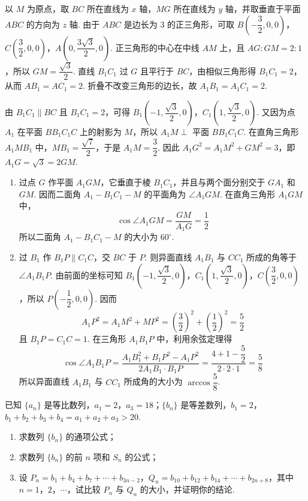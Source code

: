 \begin{solution}
以 \(M\) 为原点，取 \(BC\) 所在直线为 \(x\) 轴，\(MG\) 所在直线为 \(y\) 轴，并取垂直于平面 \(ABC\) 的方向为 \(z\) 轴. 由于 \(ABC\) 是边长为 \(3\) 的正三角形，可取 \(B\left(-\dfrac32,0,0\right)\)，\(C\left(\dfrac32,0,0\right)\)，\(A\left(0,\dfrac{3\sqrt3}{2},0\right)\).
正三角形的中心在中线 \(AM\) 上，且 \(AG:GM=2:1\)，所以 \(GM=\dfrac{\sqrt3}{2}\). 直线 \(B_1C_1\) 过 \(G\) 且平行于 \(BC\)，由相似三角形得 \(B_1C_1=2\)，从而 \(AB_1=AC_1=2\). 折叠不改变三角形的边长，故 \(A_1B_1=A_1C_1=2\).

由 \(B_1C_1\parallel BC\) 且 \(B_1C_1=2\)，可得 \(B_1\left(-1,\dfrac{\sqrt3}{2},0\right)\)，\(C_1\left(1,\dfrac{\sqrt3}{2},0\right)\). 又因为点 \(A_1\) 在平面 \(BB_1C_1C\) 上的射影为 \(M\)，所以 \(A_1M\perp\) 平面 \(BB_1C_1C\). 在直角三角形 \(A_1MB_1\) 中，\(MB_1=\dfrac{\sqrt7}{2}\)，于是 \(A_1M=\dfrac32\). 因此 \(A_1G^2=A_1M^2+GM^2=3\)，即 \(A_1G=\sqrt3=2GM\).

\begin{enumerate}
\item 过点 \(G\) 作平面 \(A_1GM\)，它垂直于棱 \(B_1C_1\)，并且与两个面分别交于 \(GA_1\) 和 \(GM\). 因而二面角 \(A_1-B_1C_1-M\) 的平面角为 \(\angle A_1GM\). 在直角三角形 \(A_1GM\) 中，
\[
\cos\angle A_1GM=\dfrac{GM}{A_1G}=\dfrac12
\]
所以二面角 \(A_1-B_1C_1-M\) 的大小为 \(60^\circ\).

\item 过 \(B_1\) 作 \(B_1P\parallel C_1C\)，交 \(BC\) 于 \(P\). 则异面直线 \(A_1B_1\) 与 \(CC_1\) 所成的角等于 \(\angle A_1B_1P\). 由前面的坐标可知 \(B_1\left(-1,\dfrac{\sqrt3}{2},0\right)\)，\(C_1\left(1,\dfrac{\sqrt3}{2},0\right)\)，\(C\left(\dfrac32,0,0\right)\)，所以 \(P\left(-\dfrac12,0,0\right)\). 因而
\[
A_1P^2=A_1M^2+MP^2=\left(\dfrac32\right)^2+\left(\dfrac12\right)^2=\dfrac52
\]
且 \(B_1P=C_1C=1\). 在三角形 \(A_1B_1P\) 中，利用余弦定理得
\[
\cos\angle A_1B_1P
=\dfrac{A_1B_1^2+B_1P^2-A_1P^2}{2A_1B_1\cdot B_1P}
=\dfrac{4+1-\dfrac52}{2\cdot2\cdot1}
=\dfrac58
\]
所以异面直线 \(A_1B_1\) 与 \(CC_1\) 所成角的大小为 \(\arccos\dfrac58\).
\end{enumerate}
\end{solution}

\begin{problem}
已知 \(\{a_n\}\) 是等比数列，\(a_1=2\)，\(a_3=18\)；\(\{b_n\}\) 是等差数列，\(b_1=2\)，\(b_1+b_2+b_3+b_4=a_1+a_2+a_3>20\).

\begin{enumerate}
\item 求数列 \(\{b_n\}\) 的通项公式；
\item 求数列 \(\{b_n\}\) 的前 \(n\) 项和 \(S_n\) 的公式；
\item 设 \(P_n=b_1+b_4+b_7+\cdots+b_{3n-2}\)，\(Q_n=b_{10}+b_{12}+b_{14}+\cdots+b_{2n+8}\)，其中 \(n=1\)，\(2\)，\(\cdots\)，试比较 \(P_n\) 与 \(Q_n\) 的大小，并证明你的结论.
\end{enumerate}
\end{problem}

